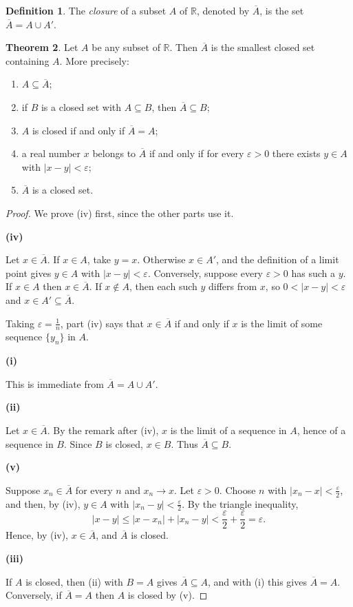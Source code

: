 \documentclass[11pt,a4paper]{article}
\numberwithin{equation}{section}
\theoremstyle{definition}
\newtheorem{thm}{Theorem}[subsection]
\newtheorem{defn}[thm]{Definition}
\newcommand{\subhead}[1]{%
  \par\medskip\noindent\textbf{#1}\par\nobreak\smallskip}
\begin{document}
\begin{defn}
The \emph{closure} of a subset $A$ of $\mathbb{R}$, denoted by $\overline{A}$, is the set $\overline{A} = A \cup A'$.
\end{defn}


\begin{thm}\label{thm:closure}
Let $A$ be any subset of $\mathbb{R}$. Then $\overline{A}$ is the smallest closed set containing $A$. More precisely:
\begin{enumerate}
\item[(i)] $A \subseteq \overline{A}$;
\item[(ii)] if $B$ is a closed set with $A\subseteq B$, then $\overline{A}\subseteq B$;
\item[(iii)] $A$ is closed if and only if $\overline{A} = A$;
\item[(iv)] a real number $x$ belongs to $\overline{A}$ if and only if for every $\varepsilon > 0$ there exists $y \in A$ with $|x - y| < \varepsilon$;
\item[(v)] $\overline{A}$ is a closed set.
\end{enumerate}
\end{thm}

\begin{proof}
We prove (iv) first, since the other parts use it.

\subhead{(iv)} Let $x\in\overline{A}$. If $x\in A$, take $y = x$. Otherwise $x\in A'$, and the definition of a limit point gives $y\in A$ with $|x-y|<\varepsilon$. Conversely, suppose every $\varepsilon>0$ has such a $y$. If $x\in A$ then $x\in\overline{A}$. If $x\notin A$, then each such $y$ differs from $x$, so $0<|x-y|<\varepsilon$ and $x\in A'\subseteq \overline{A}$.

Taking $\varepsilon = \frac{1}{n}$, part (iv) says that $x \in \overline{A}$ if and only if $x$ is the limit of some sequence $\{y_n\}$ in $A$.

\subhead{(i)} This is immediate from $\overline{A} = A \cup A'$.

\subhead{(ii)} Let $x\in\overline{A}$. By the remark after (iv), $x$ is the limit of a sequence in $A$, hence of a sequence in $B$. Since $B$ is closed, $x\in B$. Thus $\overline{A}\subseteq B$.

\subhead{(v)} Suppose $x_n\in\overline{A}$ for every $n$ and $x_n\longrightarrow x$. Let $\varepsilon>0$. Choose $n$ with $|x_n - x|<\frac{\varepsilon}{2}$, and then, by (iv), $y\in A$ with $|x_n - y|<\frac{\varepsilon}{2}$. By the triangle inequality,
$$|x - y| \leq |x - x_n| + |x_n - y| < \frac{\varepsilon}{2} + \frac{\varepsilon}{2} = \varepsilon .$$
Hence, by (iv), $x\in\overline{A}$, and $\overline{A}$ is closed.

\subhead{(iii)} If $A$ is closed, then (ii) with $B=A$ gives $\overline{A}\subseteq A$, and with (i) this gives $\overline{A}=A$. Conversely, if $\overline{A}=A$ then $A$ is closed by (v).
\end{proof}
\end{document}

